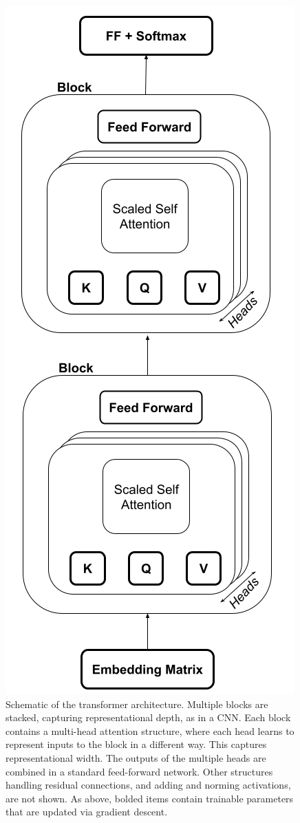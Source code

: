 \begin{figure}[h]
\centering
\includegraphics[scale=.35]{./images/transformerArchitectureSchematic.png}
\caption[Jeff Yoshimi with consultation from Tim Meyer.]{Schematic of the transformer architecture. Multiple blocks are stacked, capturing representational depth, as in a CNN. Each block contains a multi-head attention structure, where each head learns to represent inputs to the block in a different way. This captures representational width. The outputs of the multiple heads are combined in a standard feed-forward network. Other structures handling residual connections, and adding and norming activations, are not shown. As above, bolded items contain trainable parameters that are updated via gradient descent.}
\label{transformerArchitectureSchematic}
\end{figure}
 
